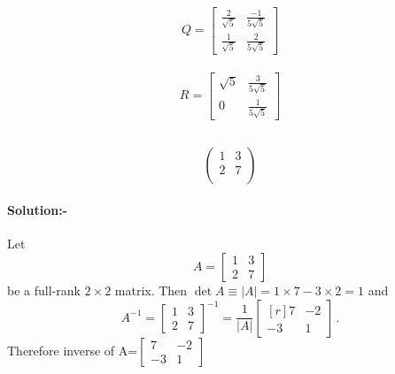 \documentclass[a4paper,12pt]{article}
\begin{document}
\paragraph{\begin{equation}
	Q=
	\begin{bmatrix}
		\frac{2}{\sqrt{5}} & \frac{-1}{5\sqrt{5}}\\
		\frac{1}{\sqrt{5}} & \frac{2}{5\sqrt{5}}
	\end{bmatrix}
\end{equation}}
\paragraph{\begin{equation}
		R=
		\begin{bmatrix}
			\sqrt{5} & \frac{3}{5\sqrt{5}}\\
			0 & \frac{1}{5\sqrt{5}}
	\end{bmatrix}
\end{equation}}
\subsection{}
\begin{equation}
	\begin{pmatrix}
		1 & 3\\
		2 & 7\\
	\end{pmatrix}
\end{equation}
\paragraph{Solution:-}
Let
\[
A = \begin{bmatrix}
	1 & 3 \\ 
	2 & 7
\end{bmatrix}
\]
be a full-rank $2\times2$ matrix. 
Then $\det A\equiv\lvert A\rvert=1\times{7}-3\times{2}=1$ and 
\[
A^{-1}=\begin{bmatrix}
	1 & 3 \\ 
	2 & 7
\end{bmatrix}^{-1}
=\frac{1}{\lvert A\rvert}
\begin{bmatrix*}[r]
	7 & -2 \\ 
	-3 &  1
\end{bmatrix*} \,.
\]
Therefore inverse of A=$\begin{bmatrix}
	7 & -2\\
	-3 & 1
\end{bmatrix}$
\newline
\end{document}
